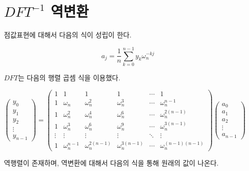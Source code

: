 \section{$DFT^{-1}$ 역변환}

점값표현에 대해서 다음의 식이 성립이 한다.

$$ a_j = \dfrac{1}{n}\sum_{k=0}^{n-1} y_k\omega_{n}^{-kj}$$

$DFT$는 다음의 행렬 곱셈 식을 이용했다.

$
\begin{pmatrix}
    y_0 \\ 
    y_1 \\
    y_2 \\
    \vdots \\
    y_{n-1}
\end{pmatrix}
=
\begin{pmatrix}
    1 & 1 & 1 & 1 & \cdots & 1 \\
    1 & \omega_n & \omega_n^2 & \omega_n^3 & \cdots & \omega_n^{n-1} \\
    1 & \omega_n^2 & \omega_n^4 & \omega_n^6 & \cdots & \omega_n^{2(n-1)} \\
    1 & \omega_n^3 & \omega_n^6 & \omega_n^9 & \cdots & \omega_n^{3(n-1)} \\
    \vdots & \vdots & \vdots & \vdots & \ddots & \vdots \\
    1 & \omega_n^{n-1} & \omega_n^{2(n-1)} & \omega_n^{3(n-1)} & \cdots & \omega_n^{(n-1)(n-1)} 
\end{pmatrix}
\begin{pmatrix}
    a_0 \\ 
    a_1 \\
    a_2 \\
    \vdots \\
    a_{n-1}
\end{pmatrix}
$

역행렬이 존재하며, 역변환에 대해서 다음의 식을 통해 원래의 값이 나온다.

